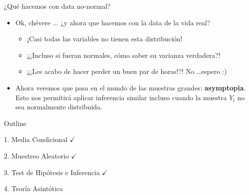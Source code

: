 \documentclass[11pt,handout,aspectratio=169]{beamer}
\begin{document}
\begin{frame}{¿Qué hacemos con data no-normal?}
\vspace{0.2cm}
\begin{itemize}
\item Ok, chévere ... ¿y ahora que hacemos con la data de la vida real?
\pause{}
\smallskip

\begin{itemize}
\item ¡Casi todas las variables no tienen esta distribución!\pause{}
\vspace{0.1cm}
\item ¡¿Incluso si fueran normales, cómo saber su varianza verdadera?!\pause{}
\vspace{0.1cm}
\item ¡¿Les acabo de hacer perder un buen par de horas!?! \pause{} No \dots espero :) \pause{}
\end{itemize}
\vspace{0.4cm}

\item Ahora veremos que pasa en el mundo de las muestras grandes: \textbf{asymptopia}. Esto nos permitirá aplicar inferencia similar incluso cuando la muestra $Y_i$ no sea normalmente distribuida.
\end{itemize}

\end{frame}





\begin{frame}{Outline}
	
	\textcolor{red!75!green!50!blue!25!gray}{1. Media Condicional} $\checkmark$
	\vspace{0.8cm}
	
	
	\textcolor{red!75!green!50!blue!25!gray}{2. Muestreo Aleatorio} $\checkmark$
	
	\vspace{0.8cm}
	\textcolor{red!75!green!50!blue!25!gray}{3. Test de Hipótesis e Inferencia} $\checkmark$
	
	\vspace{0.8cm}
	4. Teoría Asintótica	
	
\end{frame}
\end{document}
